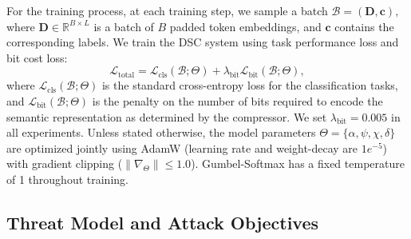 \documentclass[journal]{IEEEtran}
\begin{document}
{For the training process, at each training step, we sample a batch 
\(
\mathcal{B} = (\mathbf{D}, \mathbf{c}),
\)
where 
\(\mathbf{D} \in \mathbb{R}^{B \times L}\) is a batch of \(B\) padded token embeddings, and $\mathbf{c}$ contains the corresponding labels.
We train the DSC system using task performance loss and bit cost loss:
\begin{equation}
\mathcal{L}_{\mathrm{total}} 
= \mathcal{L}_{\mathrm{cls}} (\mathcal{B}; \Theta)
+ \lambda_{\mathrm{bit}} \mathcal{L}_{\mathrm{bit}}(\mathcal{B}; \Theta),
\label{eq:total}
\end{equation}
where $\mathcal{L}_{\mathrm{cls}}(\mathcal{B}; \Theta)$ is the standard cross-entropy loss for the classification tasks, and $\mathcal{L}_{\mathrm{bit}}(\mathcal{B}; \Theta)$ is the penalty on the number of bits required to encode the semantic representation as determined by the compressor. }We set
\(\lambda_{\mathrm{bit}} = 0.005\) in all experiments. Unless stated otherwise, the model parameters \(\Theta = \{\alpha, \psi, \chi, \delta\}\) are optimized jointly using AdamW (learning rate and weight-decay are $1e^{-5}$) with gradient clipping (\(\|\nabla_\Theta\| \leq 1.0\)). Gumbel-Softmax has a fixed temperature of 1 throughout training.

\subsection{Threat Model and Attack Objectives}
  
\end{document}
